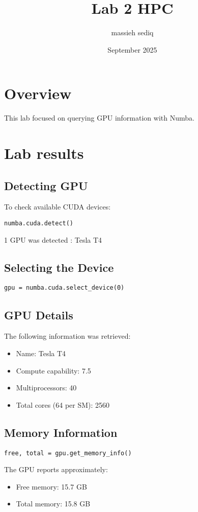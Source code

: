 \documentclass{article}
\title{Lab 2 HPC}
\author{massieh sediq}
\date{September 2025}
\begin{document}
\maketitle

\section{Overview}
This lab focused on querying GPU information with Numba.

\section{Lab results}

\subsection*{Detecting GPU}
To check available CUDA devices:
\begin{verbatim}
numba.cuda.detect()
\end{verbatim}
1 GPU was detected : Tesla T4 

\subsection*{Selecting the Device}
\begin{verbatim}
gpu = numba.cuda.select_device(0)
\end{verbatim}

\subsection*{GPU Details}
The following information was retrieved:
\begin{itemize}
    \item Name: Tesla T4
    \item Compute capability: 7.5
    \item Multiprocessors: 40
    \item Total cores (64 per SM): 2560
\end{itemize}

\subsection*{Memory Information}
\begin{verbatim}
free, total = gpu.get_memory_info()
\end{verbatim}
The GPU reports approximately:
\begin{itemize}
    \item Free memory: 15.7 GB
    \item Total memory: 15.8 GB
\end{itemize}
\end{document}
